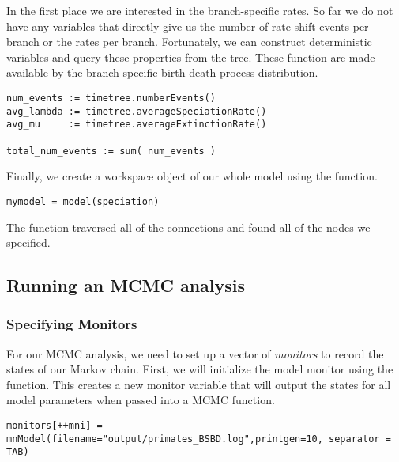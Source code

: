 In the first place we are interested in the branch-specific rates.
So far we do not have any variables that directly give us the number of rate-shift events per branch or the rates per branch.
Fortunately, we can construct deterministic variables and query these properties from the tree.
These function are made available by the branch-specific birth-death process distribution.
{\tt \begin{snugshade*}
\begin{lstlisting}
num_events := timetree.numberEvents()
avg_lambda := timetree.averageSpeciationRate()
avg_mu     := timetree.averageExtinctionRate()

total_num_events := sum( num_events )
\end{lstlisting}
\end{snugshade*}}


Finally, we create a workspace object of our whole model using the  function. 
{\tt \begin{snugshade*}
\begin{lstlisting}
mymodel = model(speciation)
\end{lstlisting}
\end{snugshade*}}

The  function traversed all of the connections and found all of the nodes we specified. 


\subsection{Running an MCMC analysis}

\subsubsection{Specifying Monitors}

For our MCMC analysis, we need to set up a vector of \textit{monitors} to record the states of our Markov chain. 
First, we will initialize the model monitor using the  function. This creates a new monitor variable that will output the states for all model parameters when passed into a MCMC function. 
{\tt \begin{snugshade*}
\begin{lstlisting}
monitors[++mni] = mnModel(filename="output/primates_BSBD.log",printgen=10, separator = TAB)
\end{lstlisting}
\end{snugshade*}}

